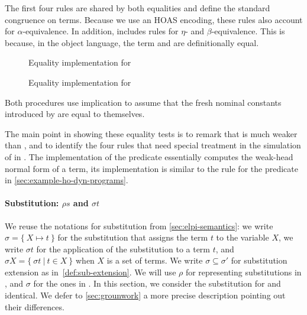 The first four rules are shared by both equalities and define
the standard congruence on terms. Because we use an HOAS
encoding, these rules also account for $\alpha$-equivalence.
In addition, \Eo includes rules for $\eta$- and
$\beta$-equivalence.
This is because, in the object language, the term  
and  are definitionally equal.
%
% 
\begin{figure}
  \vspace{-15pt}
  \caption{Equality implementation for \Fo}
  \label{fig:feq}
\end{figure}%
%
\begin{figure}
  \vspace{-15pt}
  \caption{Equality implementation for \Ho}
  \label{fig:heq}
\end{figure}

\noindent
Both procedures use implication to
assume that the fresh nominal constants introduced by  are
equal to themselves.

The main point in showing these equality tests is to remark 
that \Ee is much weaker than \Eo, 
and to identify the four rules that need special
treatment in the simulation of \Uo in \Ho.
The implementation of the predicate  essentially computes the
weak-head normal form of a term, its implementation is similar to
the rule for the predicate  in \cref{sec:example-ho-dyn-programs}.

\paragraph*{Substitution: \texorpdfstring{$\rho s$}{rho s} and \texorpdfstring{$\sigma t$}{sigma t}}

We reuse the notations for substitution from \cref{sec:elpi-semantics}:
we write $\sigma = \{~ X \mapsto t ~\}$ for the substitution that assigns
the term $t$ to the variable $X$,
we write $\sigma t$ for the application of
the substitution to a term $t$, and $\sigma X = \{~ \sigma t ~|~ t \in X ~\}$ when
$X$ is a set of terms.
We write $\sigma \subseteq \sigma'$ for substitution extension as in~\cref{def:sub-extension}.
We will use $\rho$ for representing substitutions in \Fo{},
and $\sigma$ for the ones in \Ho.
In this section, we consider
the substitution for \Fo{} and \Ho{} identical.
We defer to \cref{sec:grounwork} a more precise description
pointing out their differences.


